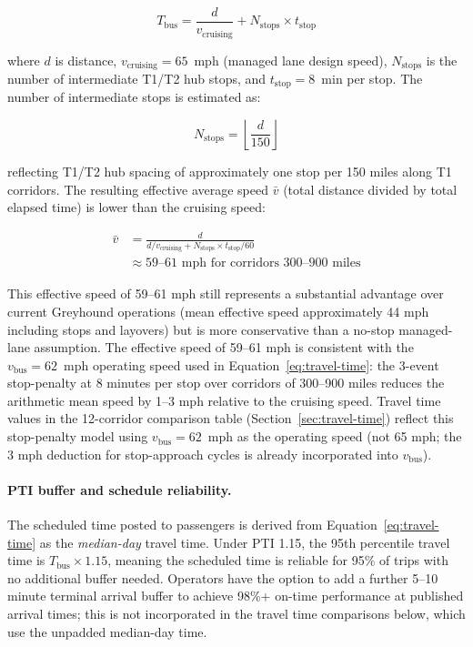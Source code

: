 \begin{equation}
T_{\text{bus}} = \frac{d}{v_{\text{cruising}}} + N_{\text{stops}} \times t_{\text{stop}}
\label{eq:bus-time}
\end{equation}

where $d$ is distance, $v_{\text{cruising}} = 65$~mph (managed lane design speed),
$N_{\text{stops}}$ is the number of intermediate T1/T2 hub stops, and $t_{\text{stop}}
= 8$~min per stop. The number of intermediate stops is estimated as:

\begin{equation}
N_{\text{stops}} = \left\lfloor \frac{d}{150} \right\rfloor
\end{equation}

reflecting T1/T2 hub spacing of approximately one stop per 150 miles along T1 corridors.
The resulting effective average speed $\bar{v}$ (total distance divided by total elapsed
time) is lower than the cruising speed:

\begin{align}
\bar{v} &= \frac{d}{d/v_{\text{cruising}} + N_{\text{stops}} \times t_{\text{stop}}/60} \\
        &\approx 59\text{--}61\text{ mph for corridors } 300\text{--}900\text{ miles}
\end{align}

This effective speed of 59--61 mph still represents a substantial advantage over current
Greyhound operations (mean effective speed approximately 44 mph including stops and layovers)
but is more conservative than a no-stop managed-lane assumption. The effective speed of
59--61 mph is consistent with the $v_{\text{bus}} = 62$~mph operating speed used in
Equation~\ref{eq:travel-time}: the 3-event stop-penalty at 8 minutes per stop over
corridors of 300--900 miles reduces the arithmetic mean speed by 1--3 mph relative to
the cruising speed. Travel time values in the 12-corridor comparison table
(Section~\ref{sec:travel-time}) reflect this stop-penalty model using $v_{\text{bus}} = 62$~mph
as the operating speed (not 65 mph; the 3 mph deduction for stop-approach cycles is already
incorporated into $v_{\text{bus}}$).

\paragraph{PTI buffer and schedule reliability.} The scheduled time posted to passengers is derived from Equation~\ref{eq:travel-time} as the \emph{median-day} travel time. Under PTI 1.15, the 95th percentile travel time is $T_{\text{bus}} \times 1.15$, meaning the scheduled time is reliable for 95\% of trips with no additional buffer needed. Operators have the option to add a further 5--10 minute terminal arrival buffer to achieve 98\%+ on-time performance at published arrival times; this is not incorporated in the travel time comparisons below, which use the unpadded median-day time.


